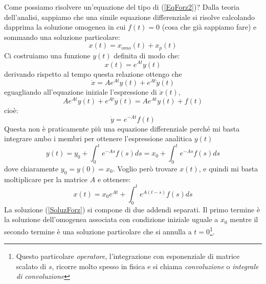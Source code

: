\documentclass[a4paper,openany]{article}
\begin{document}
	Come possiamo risolvere un'equazione del tipo di (\ref{EqForz2})? Dalla teoria dell'analisi, sappiamo che una simile equazione differenziale si risolve calcolando dapprima la soluzione omogenea in cui $f(t)=0$ (cosa che già sappiamo fare) e sommando una soluzione particolare:
	$$
	x(t) = x_{omo}(t) + x_p(t)
	$$ 
	Ci costruiamo una funzione $y(t)$ definita di modo che:
	$$
	x(t) = e^{At}y(t)
	$$
	derivando rispetto al tempo questa relazione ottengo che
	$$
	\dot{x} = Ae^{At}y(t) + e^{At}\dot{y}(t)
	$$
	eguagliando all'equazione iniziale l'espressione di $\dot{x}(t)$,
	$$
	Ae^{At}y(t) + e^{At}\dot{y}(t) = Ae^{At}y(t) + f(t)
	$$
	cioè:
	$$
	\dot{y} = e^{-At}f(t)
	$$
	Questa non è praticamente più una equazione differenziale perché mi basta integrare ambo i membri per ottenere l'espressione analitica $y(t)$
	\begin{equation}
		y(t) = y_{0} + \int_{0}^{t}e^{-As}f(s)ds = x_{0} + \int_{0}^{t}e^{-As}f(s)ds
	\end{equation}
	dove chiaramente $y_{0} = y(0) = x_{0}$. Voglio però trovare $x(t)$, e quindi mi basta moltiplicare per la matrice $A$ e ottenere:
	\begin{equation}
		x(t) = x_{0}e^{At} + \int_{0}^{t}e^{A(t-s)}f(s)ds
		\label{SoluzForz}
	\end{equation}
	La soluzione (\ref{SoluzForz}) si compone di due addendi separati. Il primo termine è la soluzione dell'omogenea associata con condizione iniziale uguale a $x_{0}$ mentre il secondo termine è una soluzione particolare che si annulla a $t=0$\footnote{Questo particolare \textit{operatore}, l'integrazione con esponenziale di matrice scalato di $s$, ricorre molto spesso in fisica e si chiama \textit{convoluzione} o \textit{integrale di convoluzione}}.
	
\end{document}
